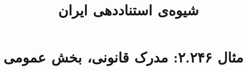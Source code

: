 \documentclass[a4paper,10pt]{article}
\begin{document}
\title{شیوه‌ی استناددهی ایران
 }
\author{}
\date{}
\maketitle



\section*{مثال ۲.۲۴۶: مدرک قانونی، بخش عمومی}

\cite{مجلس1384}\\
\cite{uscongress1956}\\






\end{document}
